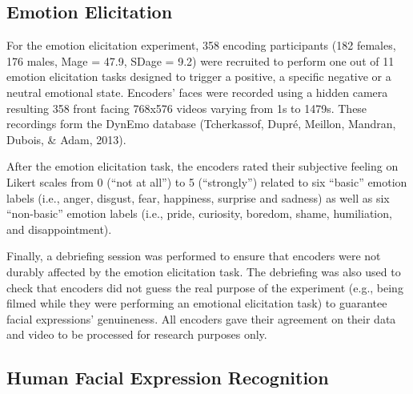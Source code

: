 \documentclass[man]{apa6}
\begin{document}
\hypertarget{emotion-elicitation}{%
\subsection{Emotion Elicitation}\label{emotion-elicitation}}

For the emotion elicitation experiment, 358 encoding participants (182 females, 176 males, Mage = 47.9, SDage = 9.2) were recruited to perform one out of 11 emotion elicitation tasks designed to trigger a positive, a specific negative or a neutral emotional state. Encoders' faces were recorded using a hidden camera resulting 358 front facing 768x576 videos varying from 1s to 1479s. These recordings form the DynEmo database (Tcherkassof, Dupré, Meillon, Mandran, Dubois, \& Adam, 2013).

After the emotion elicitation task, the encoders rated their subjective feeling on Likert scales from 0 (\enquote{not at all}) to 5 (\enquote{strongly}) related to six \enquote{basic} emotion labels (i.e., anger, disgust, fear, happiness, surprise and sadness) as well as six \enquote{non-basic} emotion labels (i.e., pride, curiosity, boredom, shame, humiliation, and disappointment).

Finally, a debriefing session was performed to ensure that encoders were not durably affected by the emotion elicitation task. The debriefing was also used to check that encoders did not guess the real purpose of the experiment (e.g., being filmed while they were performing an emotional elicitation task) to guarantee facial expressions' genuineness. All encoders gave their agreement on their data and video to be processed for research purposes only.

\hypertarget{human-facial-expression-recognition}{%
\subsection{Human Facial Expression Recognition}\label{human-facial-expression-recognition}}
\end{document}
